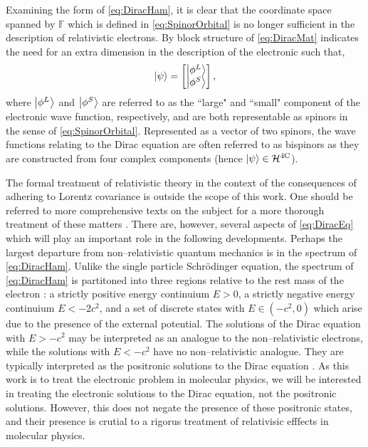 Examining the form of \cref{eq:DiracHam}, it is clear that the coordinate space spanned by $\mathbb F$
which is defined in \cref{eq:SpinorOrbital} is no longer sufficient in the description of relativistic 
electrons. By block structure of \cref{eq:DiracMat} indicates the need for an extra dimension in the 
description of the electronic such that,
\begin{equation}
\label{eq:Bispinor}
\left\vert \psi \right\rangle = \begin{bmatrix} \left\vert \phi^L \right\rangle \\ \left\vert \phi^S \right\rangle \end{bmatrix},
\end{equation}
where $\left\vert \phi^L \right\rangle$ and $\left\vert \phi^S \right\rangle$ are referred to as the ``large" and ``small" component of the 
electronic wave function, respectively, and are both representable as spinors in the sense of
\cref{eq:SpinorOrbital}. Represented as a vector of two spinors, the wave functions relating to the Dirac equation
are often referred to as bispinors  as they are constructed from four complex components (hence 
$\left\vert \psi \right\rangle \in \mathcal{H}^{\mathrm{4C}}$). 



The formal treatment of relativistic theory in the context of the consequences of adhering to Lorentz 
covariance is outside the scope of this work. One should be referred to more comprehensive texts on
the subject for a more thorough treatment of these matters . There are, however, several
aspects of \cref{eq:DiracEq} which will play an important role in the following developments. Perhaps
the largest departure from non--relativistic quantum mechanics is in the spectrum of \cref{eq:DiracHam}.
Unlike the single particle Schr\"{o}dinger equation, the spectrum of \cref{eq:DiracHam} is partitoned
into three regions relative to the rest mass of the electron : a strictly positive energy continuium 
$E > 0$, a strictly negative energy continuium $E < -2c^2$, and a set of discrete states with $E \in (-c^2,0)$ which
arise due to the presence of the external potential. The solutions of the Dirac equation with $E > -c^2$
may be interpreted as an analogue to the non--relativistic electrons, while the solutions with $E < -c^2$
have no non--relativistic analogue. They are typically interpreted as the positronic solutions to the Dirac
equation . As this work is to treat the electronic problem in molecular physics, we will
be interested in treating the electronic solutions to the Dirac equation, not the positronic solutions.
However, this does not negate the presence of these positronic states, and their presence is
crutial to a rigorus treatment of relativisic efffects in molecular physics.

